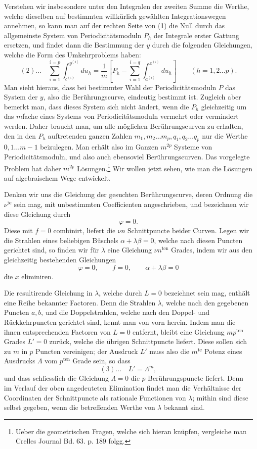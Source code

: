 \documentclass[10pt]{article}
\begin{document}
Verstehen wir insbesondere unter den Integralen der zweiten Summe die Werthe, welche dieselben auf bestimmten willkürlich gewählten Integrationswegen annehmen, so kann man auf der rechten Seite von (1) die Null durch das allgemeinste System von Periodicitätsmoduln \(P_h\) der Integrale erster Gattung ersetzen, und findet dann die Bestimmung der \(y\) durch die folgenden Gleichungen, welche die Form des Umkehrproblems haben:
\[
(2)\ldots\quad
\sum_{i=1}^{i=p}\int_{c^{(i)}}^{y^{(i)}}du_h
=
\frac{1}{m}\left[
P_h-\sum_{i=1}^{i=q}\int_{a^{(i)}}^{x^{(i)}}du_h
\right]\qquad(h=1,2\ldots p).
\]
Man sieht hieraus, dass bei bestimmter Wahl der Periodicitätsmoduln \(P\) das System der \(y\), also die Berührungscurve, eindeutig bestimmt ist. Zugleich aber bemerkt man, dass dieses System sich nicht ändert, wenn die \(P_h\) gleichzeitig um das \(m\)fache eines Systems von Periodicitätsmoduln vermehrt oder vermindert werden. Daher braucht man, um alle möglichen Berührungscurven zu erhalten, den in den \(P_h\) auftretenden ganzen Zahlen \(m_1,m_2\ldots m_p,q_1,q_2\ldots q_p\) nur die Werthe \(0,1\ldots m-1\) beizulegen. Man erhält also im Ganzen \(m^{2p}\) Systeme von Periodicitätsmoduln, und also auch ebensoviel Berührungscurven. Das vorgelegte Problem hat daher \(m^{2p}\) Lösungen.\footnote{Ueber die geometrischen Fragen, welche sich hieran knüpfen, vergleiche man Crelles Journal Bd. 63. p. 189 folgg.} Wir wollen jetzt sehen, wie man die Lösungen auf algebraischem Wege entwickelt.

Denken wir uns die Gleichung der gesuchten Berührungscurve, deren Ordnung die \(\nu^{\text{te}}\) sein mag, mit unbestimmten Coefficienten angeschrieben, und bezeichnen wir diese Gleichung durch
\[
\varphi=0.
\]
Diese mit \(f=0\) combinirt, liefert die \(\nu n\) Schnittpuncte beider Curven. Legen wir die Strahlen eines beliebigen Büschels \(\alpha+\lambda\beta=0\), welche nach diesen Puncten gerichtet sind, so finden wir für \(\lambda\) eine Gleichung \(\nu n^{\text{ten}}\) Grades, indem wir aus den gleichzeitig bestehenden Gleichungen
\[
\varphi=0,\qquad f=0,\qquad \alpha+\lambda\beta=0
\]
die \(x\) eliminiren.

Die resultirende Gleichung in \(\lambda\), welche durch \(L=0\) bezeichnet sein mag, enthält eine Reihe bekannter Factoren. Denn die Strahlen \(\lambda\), welche nach den gegebenen Puncten \(a,b\), und die Doppelstrahlen, welche nach den Doppel- und Rückkehrpuncten gerichtet sind, kennt man von vorn herein. Indem man die ihnen entsprechenden Factoren von \(L=0\) entfernt, bleibt eine Gleichung \(mp^{\text{ten}}\) Grades \(L'=0\) zurück, welche die übrigen Schnittpuncte liefert. Diese sollen sich zu \(m\) in \(p\) Puncten vereinigen; der Ausdruck \(L'\) muss also die \(m^{\text{te}}\) Potenz eines Ausdrucks \(\Lambda\) vom \(p^{\text{ten}}\) Grade sein, so dass
\[
(3)\ldots\quad L'=\Lambda^m,
\]
und dass schliesslich die Gleichung \(\Lambda=0\) die \(p\) Berührungspuncte liefert. Denn im Verlauf der oben angedeuteten Elimination findet man die Verhältnisse der Coordinaten der Schnittpuncte als rationale Functionen von \(\lambda\); mithin sind diese selbst gegeben, wenn die betreffenden Werthe von \(\lambda\) bekannt sind.
\end{document}
